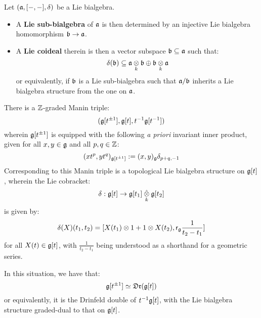         \begin{definition} \label{def: lie_sub_bialgebras_and_lie_coideals}
            Let $(\mathfrak{a}, [-, -], \delta)$ be a Lie bialgebra.
            \begin{itemize}
                \item A \textbf{Lie sub-bialgebra} of $\mathfrak{a}$ is then determined by an injective Lie bialgebra homomorphism $\mathfrak{b} \to \mathfrak{a}$. 
                \item A \textbf{Lie coideal} therein is then a vector subspace $\mathfrak{b} \subseteq \mathfrak{a}$ such that:
                    $$\delta(\b) \subseteq \a \tensor_k \b \oplus \b \tensor_k \a$$
                or equivalently, if $\mathfrak{b}$ is a Lie sub-bialgebra such that $\mathfrak{a}/\mathfrak{b}$ inherits a Lie bialgebra structure from the one on $\mathfrak{a}$.
            \end{itemize}
        \end{definition}
        \begin{example} \label{example: kac_moody_manin_triple}
            
        \end{example}
        \begin{example} \label{example: finite_type_yangian_manin_triple}
            There is a $\mathbb{Z}$-graded Manin triple:
                $$( \mathfrak{g}[t^{\pm 1}], \mathfrak{g}[t], t^{-1}\mathfrak{g}[t^{-1}] )$$
            wherein $\mathfrak{g}[t^{\pm 1}]$ is equipped with the following \textit{a priori} invariant inner product, given for all $x, y \in \mathfrak{g}$ and all $p, q \in \mathbb{Z}$:
                $$(x t^p, y t^q)_{\mathfrak{g}[t^{\pm 1}]} := (x, y)_{\mathfrak{g}} \delta_{p + q, -1}$$
            Corresponding to this Manin triple is a topological Lie bialgebra structure on $\mathfrak{g}[t]$, wherein the Lie cobracket:
                $$\delta: \g[t] \to \g[t_1] \hattensor_{k} \g[t_2]$$
            is given by:
                $$\delta(X)(t_1, t_2) = [ X(t_1) \tensor 1 + 1 \tensor X(t_2), \sfr_{\g} \frac{1}{t_2 - t_1} ]$$
            for all $X(t) \in \mathfrak{g}[t]$, with $\frac{1}{t_2 - t_1}$ being understood as a shorthand for a geometric series.

            In this situation, we have that:
                $$\mathfrak{g}[t^{\pm 1}] \simeq \mathfrak{Dr}(\mathfrak{g}[t])$$
            or equivalently, it is the Drinfeld double of $t^{-1}\mathfrak{g}[t]$, with the Lie bialgebra structure graded-dual to that on $\mathfrak{g}[t]$. 
        \end{example}

